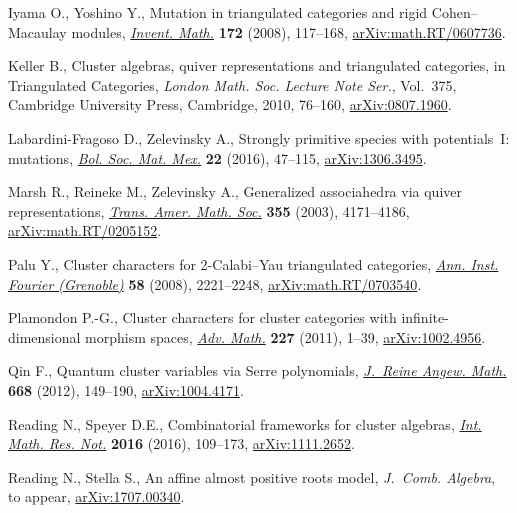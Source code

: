\documentclass[pdftex]{sigma}
\numberwithin{equation}{section}
\begin{document}
\begin{thebibliography}{99}
Iyama O., Yoshino Y., Mutation in triangulated categories and rigid
 {C}ohen--{M}acaulay modules, \href{https://doi.org/10.1007/s00222-007-0096-4}{\textit{Invent. Math.}} \textbf{172} (2008),
 117--168, \href{https://arxiv.org/abs/math.RT/0607736}{arXiv:math.RT/0607736}.

Keller B., Cluster algebras, quiver representations and triangulated
 categories, in Triangulated Categories, \textit{London Math. Soc. Lecture
 Note Ser.}, Vol.~375, Cambridge University Press, Cambridge, 2010, 76--160,
 \href{https://arxiv.org/abs/0807.1960}{arXiv:0807.1960}.

Labardini-Fragoso D., Zelevinsky A., Strongly primitive species with potentials~{I}: mutations, \href{https://doi.org/10.1007/s40590-015-0063-9}{\textit{Bol. Soc. Mat. Mex.}} \textbf{22} (2016), 47--115, \href{https://arxiv.org/abs/1306.3495}{arXiv:1306.3495}.

Marsh R., Reineke M., Zelevinsky A., Generalized associahedra via quiver
 representations, \href{https://doi.org/10.1090/S0002-9947-03-03320-8}{\textit{Trans. Amer. Math. Soc.}} \textbf{355} (2003),
 4171--4186, \href{https://arxiv.org/abs/math.RT/0205152}{arXiv:math.RT/0205152}.

Palu Y., Cluster characters for 2-{C}alabi--{Y}au triangulated categories,
 \href{https://doi.org/10.5802/aif.2412}{\textit{Ann. Inst. Fourier (Grenoble)}} \textbf{58} (2008), 2221--2248,
 \href{https://arxiv.org/abs/math.RT/0703540}{arXiv:math.RT/0703540}.

Plamondon P.-G., Cluster characters for cluster categories with
 infinite-dimensional morphism spaces, \href{https://doi.org/10.1016/j.aim.2010.12.010}{\textit{Adv. Math.}} \textbf{227}
 (2011), 1--39, \href{https://arxiv.org/abs/1002.4956}{arXiv:1002.4956}.

Qin F., Quantum cluster variables via {S}erre polynomials, \href{https://doi.org/10.1515/CRELLE.2011.129}{\textit{J.~Reine
 Angew. Math.}} \textbf{668} (2012), 149--190, \href{https://arxiv.org/abs/1004.4171}{arXiv:1004.4171}.

Reading N., Speyer D.E., Combinatorial frameworks for cluster algebras,
 \href{https://doi.org/10.1093/imrn/rnv101}{\textit{Int. Math. Res. Not.}} \textbf{2016} (2016), 109--173,
 \href{https://arxiv.org/abs/1111.2652}{arXiv:1111.2652}.

Reading N., Stella S., An affine almost positive roots model, \textit{J.~Comb. Algebra}, {t}o appear, \href{https://arxiv.org/abs/1707.00340}{arXiv:1707.00340}.


\end{thebibliography}
\end{document}
